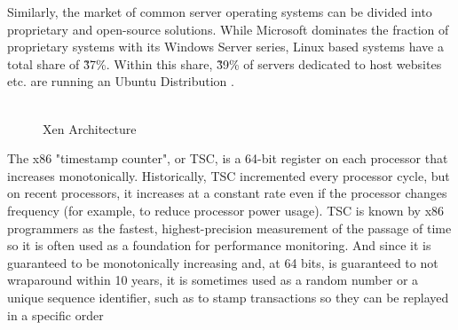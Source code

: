 Similarly, the market of common server operating systems can be divided into proprietary and open-source solutions. While Microsoft dominates the fraction of proprietary systems with its Windows Server series, Linux based systems have a total share of \~37\%. Within this share, \~39\% of servers dedicated to host websites etc. are running an Ubuntu Distribution \cite{statsharelinux} . \\~\\

\begin{figure}[H]
	\centering
	
	\caption{Xen Architecture} \label{fig:xen-arch}
\end{figure}





The x86 "timestamp counter", or TSC, is a 64-bit register on each
processor that increases monotonically.  Historically, TSC incremented
every processor cycle, but on recent processors, it increases
at a constant rate even if the processor changes frequency (for example,
to reduce processor power usage).  TSC is known by x86 programmers
as the fastest, highest-precision measurement of the passage of time
so it is often used as a foundation for performance monitoring.
And since it is guaranteed to be monotonically increasing and, at
64 bits, is guaranteed to not wraparound within 10 years, it is
sometimes used as a random number or a unique sequence identifier,
such as to stamp transactions so they can be replayed in a specific
order
\cite{xentscmode}

